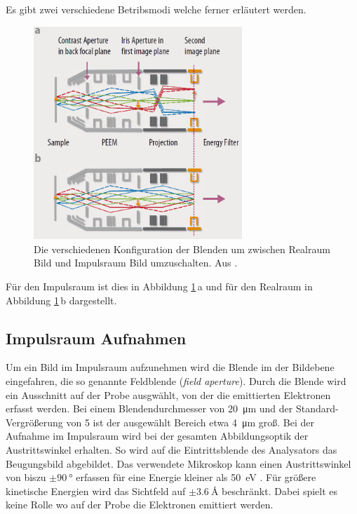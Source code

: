         Es gibt zwei verschiedene Betribsmodi welche ferner erläutert werden.
        \begin{figure}
            \centering
            \includegraphics[width=0.7\textwidth]{./content/Real_k.PNG}
            \caption{Die verschiedenen Konfiguration der Blenden um zwischen Realraum Bild und Impulsraum Bild umzuschalten. Aus \cite{Focus}.}
            \label{fig:real_k}
        \end{figure}
        Für den Impulsraum ist dies in Abbildung \ref{fig:real_k}\,a und für den Realraum in Abbildung \ref{fig:real_k}\,b dargestellt.

        \subsection{Impulsraum Aufnahmen}
            Um ein Bild im Impulsraum aufzunehmen wird die Blende im der Bildebene eingefahren, die so genannte Feldblende (\textit{field aperture}).
            Durch die Blende wird ein Ausschnitt auf der Probe ausgwählt, von der die emittierten Elektronen erfasst werden.
            Bei einem Blendendurchmesser von \SI{20}{\micro\meter} und der Standard-Vergrößerung von \num{5} ist der ausgewählt Bereich etwa \SI{4}{\micro\meter} groß.
            Bei der Aufnahme im Impulsraum wird bei der gesamten Abbildungsoptik der Austrittswinkel erhalten.
            So wird auf die Eintrittsblende des Analysators das Beugungsbild abgebildet.
            Das verwendete Mikroskop kann einen Austrittswinkel von biszu $\pm\SI{90}{\degree}$ erfassen für eine Energie kleiner als \SI{50}{\electronvolt} \cite[21]{SPECS-MM}.
            Für größere kinetische Energien wird das Sichtfeld auf $\pm\SI{3.6}{\angstrom}$ beschränkt.
            Dabei spielt es keine Rolle wo auf der Probe die Elektronen emittiert werden.


